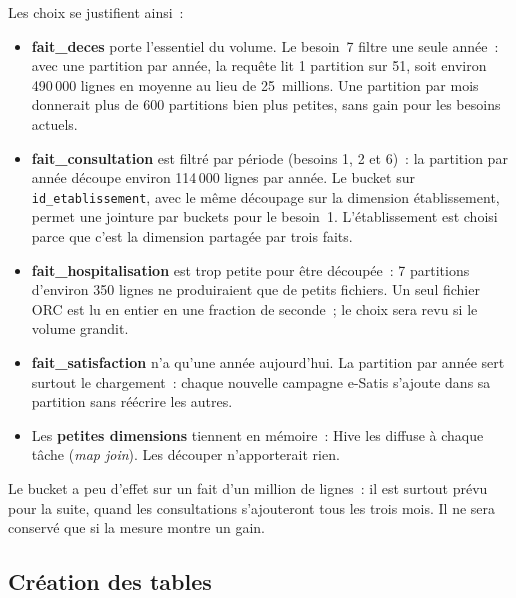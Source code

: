 \noindent Les choix se justifient ainsi~:
\begin{itemize}
	\item \textbf{fait\_deces} porte l'essentiel du volume. Le besoin~7 filtre une seule année~: avec une partition par année, la requête lit 1 partition sur 51, soit environ 490\,000 lignes en moyenne au lieu de 25~millions. Une partition par mois donnerait plus de 600 partitions bien plus petites, sans gain pour les besoins actuels.
	\item \textbf{fait\_consultation} est filtré par période (besoins 1, 2 et 6)~: la partition par année découpe environ 114\,000 lignes par année. Le bucket sur \texttt{id\_etablissement}, avec le même découpage sur la dimension établissement, permet une jointure par buckets pour le besoin~1. L'établissement est choisi parce que c'est la dimension partagée par trois faits.
	\item \textbf{fait\_hospitalisation} est trop petite pour être découpée~: 7 partitions d'environ 350 lignes ne produiraient que de petits fichiers. Un seul fichier ORC est lu en entier en une fraction de seconde~; le choix sera revu si le volume grandit.
	\item \textbf{fait\_satisfaction} n'a qu'une année aujourd'hui. La partition par année sert surtout le chargement~: chaque nouvelle campagne e-Satis s'ajoute dans sa partition sans réécrire les autres.
	\item Les \textbf{petites dimensions} tiennent en mémoire~: Hive les diffuse à chaque tâche (\textit{map join}). Les découper n'apporterait rien.
\end{itemize}

\noindent Le bucket a peu d'effet sur un fait d'un million de lignes~: il est surtout prévu pour la suite, quand les consultations s'ajouteront tous les trois mois. Il ne sera conservé que si la mesure montre un gain.

\subsection{Création des tables}

